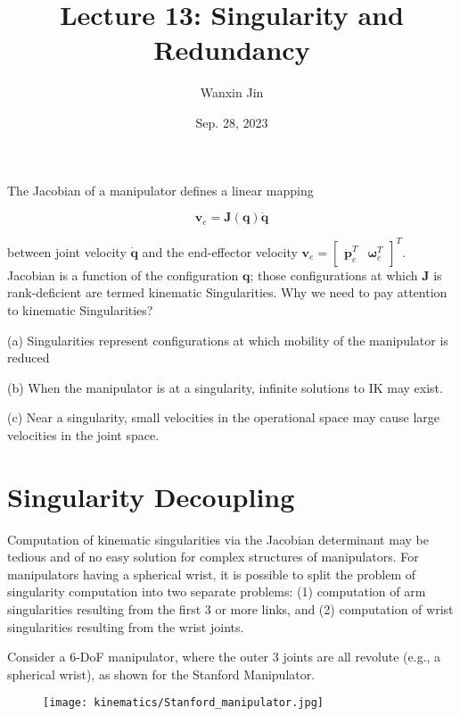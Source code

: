 \documentclass[10pt]{article}
\begin{document}
\title{Lecture 13:  Singularity and Redundancy}
\date{Sep. 28, 2023}
\author{Wanxin Jin}
\maketitle



The Jacobian of a manipulator defines a linear mapping

$$
\boldsymbol{v}_{e}=\boldsymbol{J}(\boldsymbol{q}) \dot{\boldsymbol{q}}
$$

between  joint velocity $\dot{\boldsymbol{q}}$ and the end-effector velocity $\boldsymbol{v}_{e}=\left[\begin{array}{ll}\dot{\boldsymbol{p}}_{e}^{T} & \boldsymbol{\omega}_{e}^{T}\end{array}\right]^{T}$. Jacobian is a function of the configuration $\boldsymbol{q}$; those configurations at which $\boldsymbol{J}$ is rank-deficient are termed kinematic Singularities. Why we need to pay attention to kinematic Singularities?

(a) Singularities represent configurations at which mobility of the manipulator is reduced

(b) When the manipulator is at a singularity, infinite solutions to IK may exist.

(c) Near a singularity, small velocities in the operational space may cause large velocities in the joint space.








\section{Singularity Decoupling}
Computation of kinematic singularities via the Jacobian determinant may be tedious and of no easy solution for complex structures of manipulators. For manipulators having a spherical wrist, it is possible to split the problem of singularity computation into two separate problems: (1) computation of arm singularities resulting from the first 3 or more links, and (2) computation of wrist singularities resulting from the wrist joints.



Consider a $6$-DoF manipulator, where the outer 3 joints are all revolute (e.g., a spherical wrist), as shown for the Stanford Manipulator. 

\begin{figure}[H]
    \centering
    \texttt{[image: kinematics/Stanford\_manipulator.jpg]}
    \label{c1.l2.fig.Stanford}
\end{figure}
\end{document}
